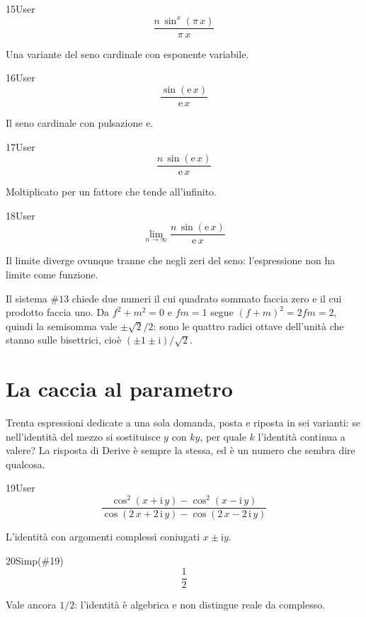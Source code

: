 \begin{espr}{15}{User}{}
\[
\frac{n\, \sin^{x}\!\left(\pi\, x\right)}{\pi\, x}
\]
\end{espr}
Una variante del seno cardinale con esponente variabile.

\begin{espr}{16}{User}{}
\[
\frac{\sin\!\left(\mathrm{e}\, x\right)}{\mathrm{e}\, x}
\]
\end{espr}
Il seno cardinale con pulsazione $\mathrm{e}$.

\begin{espr}{17}{User}{}
\[
\frac{n\, \sin\!\left(\mathrm{e}\, x\right)}{\mathrm{e}\, x}
\]
\end{espr}
Moltiplicato per un fattore che tende all'infinito.

\begin{espr}{18}{User}{}
\[
\lim_{n \to \infty} \frac{n\, \sin\!\left(\mathrm{e}\, x\right)}{\mathrm{e}\, x}
\]
\end{espr}
Il limite diverge ovunque tranne che negli zeri del seno: l'espressione non ha limite come funzione.


Il sistema $\#13$ chiede due numeri il cui quadrato sommato faccia zero e il cui prodotto faccia uno. Da $f^2+m^2=0$ e $fm=1$ segue $(f+m)^2=2fm=2$, quindi la semisomma vale $\pm\sqrt2/2$: sono le quattro radici ottave dell'unità che stanno sulle bisettrici, cioè $(\pm1\pm\mathrm{i})/\sqrt2$.

\section{La caccia al parametro}

Trenta espressioni dedicate a una sola domanda, posta e riposta in sei varianti: se nell'identità del mezzo si sostituisce $y$ con $ky$, per quale $k$ l'identità continua a valere? La risposta di Derive è sempre la stessa, ed è un numero che sembra dire qualcosa.

\begin{espr}{19}{User}{}
\[
\frac{\cos^{2}\!\left(x + \mathrm{i}\, y\right) - \cos^{2}\!\left(x - \mathrm{i}\, y\right)}{\cos\!\left(2\, x + 2\, \mathrm{i}\, y\right) - \cos\!\left(2\, x - 2\, \mathrm{i}\, y\right)}
\]
\end{espr}
L'identità con argomenti complessi coniugati $x\pm\mathrm{i}y$.

\begin{espr}{20}{Simp(\#19)}{}
\[
\frac{1}{2}
\]
\end{espr}
Vale ancora $1/2$: l'identità è algebrica e non distingue reale da complesso.

